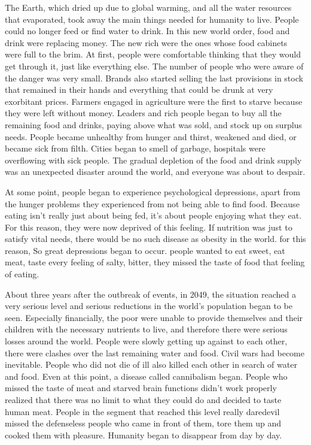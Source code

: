\documentclass[]{book}
\begin{document}
The Earth, which dried up due to global warming, and all the water resources that evaporated, took away the main things needed for humanity to live. People could no longer feed or find water to drink. In this new world order, food and drink were replacing money. The new rich were the ones whose food cabinets were full to the brim. At first, people were comfortable thinking that they would get through it, just like everything else. The number of people who were aware of the danger was very small. Brands also started selling the last provisions in stock that remained in their hands and everything that could be drunk at very exorbitant prices. Farmers engaged in agriculture were the first to starve because they were left without money. Leaders and rich people began to buy all the remaining food and drinks, paying above what was sold, and stock up on surplus needs. People became unhealthy from hunger and thirst, weakened and died, or became sick from filth. Cities began to smell of garbage, hospitals were overflowing with sick people. The gradual depletion of the food and drink supply was an unexpected disaster around the world, and everyone was about to despair.

At some point, people began to experience psychological depressions, apart from the hunger problems they experienced from not being able to find food. Because eating isn't really just about being fed, it's about people enjoying what they eat. For this reason, they were now deprived of this feeling. If nutrition was just to satisfy vital needs, there would be no such disease as obesity in the world. for this reason, So great depressions began to occur. people wanted to eat sweet, eat meat, taste every feeling of salty, bitter, they missed the taste of food that feeling of eating.

About three years after the outbreak of events, in 2049, the situation reached a very serious level and serious reductions in the world's population began to be seen. Especially financially, the poor were unable to provide themselves and their children with the necessary nutrients to live, and therefore there were serious losses around the world. People were slowly getting up against to each other, there were clashes over the last remaining water and food. Civil wars had become inevitable. People who did not die of ill also killed each other in search of water and food. Even at this point, a disease called cannibalism began. People who missed the taste of meat and starved brain functions didn't work properly realized that there was no limit to what they could do and decided to taste human meat. People in the segment that reached this level really daredevil missed the defenseless people who came in front of them, tore them up and cooked them with pleasure. Humanity began to disappear from day by day.
\end{document}
